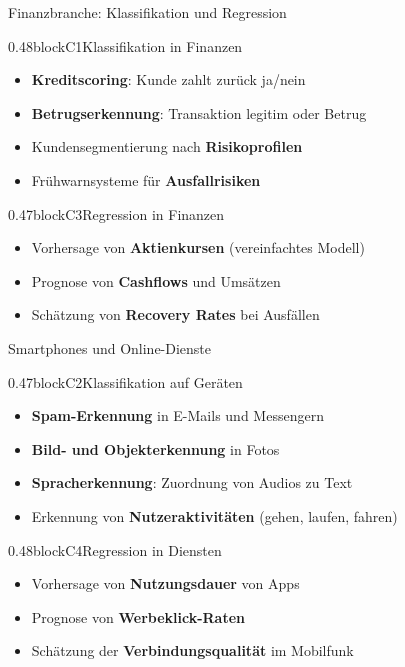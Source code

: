 \begin{frame}{Finanzbranche: Klassifikation und Regression}
\begin{blockrow}
  \begin{blockcol}{0.48\linewidth}{blockC1}{Klassifikation in Finanzen}
    \begin{itemize}
      \item \textbf{Kreditscoring}: Kunde zahlt zurück ja/nein
      \item \textbf{Betrugserkennung}: Transaktion legitim oder Betrug
      \item Kundensegmentierung nach \textbf{Risikoprofilen}
      \item Frühwarnsysteme für \textbf{Ausfallrisiken}
    \end{itemize}
  \end{blockcol}

  \begin{blockcol}{0.47\linewidth}{blockC3}{Regression in Finanzen}
    \begin{itemize}
      \item Vorhersage von \textbf{Aktienkursen} (vereinfachtes Modell)
      \item Prognose von \textbf{Cashflows} und Umsätzen
      \item Schätzung von \textbf{Recovery Rates} bei Ausfällen
    \end{itemize}
  \end{blockcol}
\end{blockrow}
\end{frame}


\begin{frame}{Smartphones und Online-Dienste}
\begin{blockrow}
  \begin{blockcol}{0.47\linewidth}{blockC2}{Klassifikation auf Geräten}
    \begin{itemize}
      \item \textbf{Spam-Erkennung} in E-Mails und Messengern
      \item \textbf{Bild- und Objekterkennung} in Fotos
      \item \textbf{Spracherkennung}: Zuordnung von Audios zu Text
      \item Erkennung von \textbf{Nutzeraktivitäten} (gehen, laufen, fahren)
    \end{itemize}
  \end{blockcol}

  \begin{blockcol}{0.48\linewidth}{blockC4}{Regression in Diensten}
    \begin{itemize}
      \item Vorhersage von \textbf{Nutzungsdauer} von Apps
      \item Prognose von \textbf{Werbeklick-Raten}
      \item Schätzung der \textbf{Verbindungsqualität} im Mobilfunk
    \end{itemize}
  \end{blockcol}
\end{blockrow}
\end{frame}

